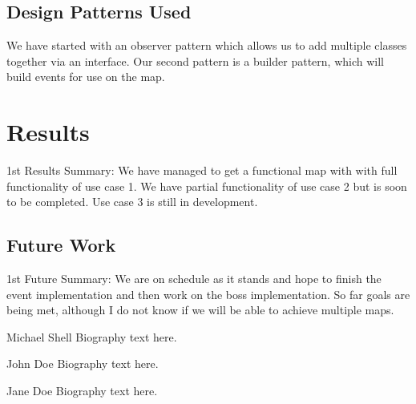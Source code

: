 \documentclass[10pt,conference,onecolumn,compsoc]{IEEEtran}
\begin{document}
\subsection{Design Patterns Used}
We have started with an observer pattern which allows us to add multiple classes together via an interface. Our second pattern is a builder pattern, which will build events for use on the map.


\section{Results}
1st Results Summary: We have managed to get a functional map with with full functionality of use case 1. We have partial functionality of use case 2 but is soon to be completed. Use case 3 is still in development. 

\subsection{Future Work}
1st Future Summary: We are on schedule as it stands and hope to finish the event implementation and then work on the boss implementation. So far goals are being met, although I do not know if we will be able to achieve multiple maps.







\begin{IEEEbiography}{Michael Shell}
Biography text here.
\end{IEEEbiography}

\begin{IEEEbiographynophoto}{John Doe}
Biography text here.
\end{IEEEbiographynophoto}


\begin{IEEEbiographynophoto}{Jane Doe}
Biography text here.
\end{IEEEbiographynophoto}





\end{document}
